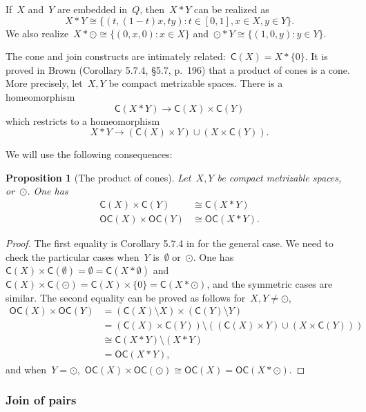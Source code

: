 \documentclass[english,11pt]{article}
\theoremstyle{plain}
\newtheorem{proposition}{Proposition}[section]
\theoremstyle{remark}
\theoremstyle{definition}
\newcommand{\unit}{\odot}%
\newcommand{\C}[1]{\mathsf{C}(#1)}%
\newcommand{\OC}[1]{\mathsf{OC}(#1)}%
\begin{document}
If~$X$ and~$Y$ are embedded in~$Q$, then~$X*Y$ can be realized as
\begin{equation*}
X*Y\cong\{(t,(1-t)x,ty):t\in[0,1],x\in X,y\in Y\}.
\end{equation*}
We also realize~$X*\unit\cong\{(0,x,0):x\in X\}$ and~$\unit*Y\cong\{(1,0,y):y\in Y\}$.

The cone and join constructs are intimately related:~$\C{X}=X*\{0\}$. It is proved in Brown \cite{Brown06} (Corollary 5.7.4, \S 5.7, p.~196) that a product of cones is a cone. More precisely, let~$X,Y$ be compact metrizable spaces. There is a homeomorphism
\begin{equation*}
\C{X*Y}\to \C{X}\times\C{Y}
\end{equation*}
which restricts to a homeomorphism
\begin{equation*}
X*Y\to (\C{X}\times Y)\cup (X\times \C{Y}).
\end{equation*}

We will use the following consequences:
\begin{proposition}[The product of cones]\label{prop_cone_product}
Let~$X,Y$ be compact metrizable spaces, or~$\unit$. One has
\begin{align*}
\C{X}\times\C{Y}&\cong\C{X*Y}\\
\OC{X}\times\OC{Y}&\cong\OC{X*Y}.
\end{align*}
\end{proposition}

\begin{proof}
The first equality is Corollary 5.7.4 in \cite{Brown06} for the general case. We need to check the particular cases when~$Y$ is~$\emptyset$ or~$\unit$. One has~$\C{X}\times \C{\emptyset}=\emptyset=\C{X*\emptyset}$ and~$\C{X}\times\C{\unit}=\C{X}\times \{0\}=\C{X*\unit}$, and the symmetric cases are similar. The second equality can be proved as follows for~$X,Y\neq\unit$,
\begin{align*}
\OC{X}\times\OC{Y} & =(\C{X}\setminus X)\times(\C{Y}\setminus Y)\\
 & =(\C{X}\times \C{Y})\setminus((\C{X}\times Y)\cup(X\times\C{Y}))\\
 & \cong\C{X*Y}\setminus (X*Y)\\
 & =\OC{X*Y},
\end{align*}
and when~$Y=\unit$,~$\OC{X}\times\OC{\unit}\cong\OC{X}=\OC{X*\unit}$.
\end{proof}

\subsubsection{Join of pairs}
\end{document}

